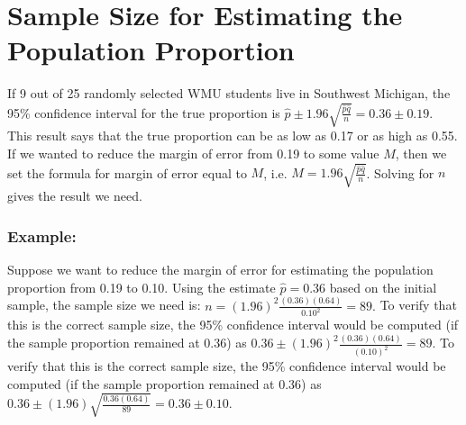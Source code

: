 \documentclass[11pt, chapterprefix=true]{scrbook}\usepackage[]{graphicx}\usepackage[]{color}
\begin{document}
\section{Sample Size for Estimating the Population Proportion}

If 9 out of 25 randomly selected WMU students live in Southwest Michigan, the 95\% confidence interval for the true proportion is $\hat{p} \pm 1.96 \sqrt{\frac{\hat{p} \hat{q}}{n}} = 0.36 \pm 0.19$.  This result says that the true proportion can be as low as 0.17 or as high as 0.55.  If we wanted to reduce the margin of error from 0.19 to some value $M$, then we set the formula for margin of error equal to $M$, i.e. $M = 1.96 \sqrt{\frac{\hat{p} \hat{q}}{n}}$.  Solving for $n$ gives the result we need.


\subsubsection{Example:} Suppose we want to reduce the margin of error for estimating the population proportion from 0.19 to 0.10.  Using the estimate $\hat{p} = 0.36$  based on the initial sample, the sample size we need is: $
n = (1.96)^2 \frac{(0.36)(0.64)}{0.10^2} = 89.$  To verify that this is the correct sample size, the 95\% confidence interval would be computed (if the sample proportion remained at 0.36) as $ 0.36 \pm (1.96)^2 \frac{(0.36)(0.64)}{(0.10)^2} = 89$.  To verify that this is the correct sample size, the 95\% confidence interval would be computed (if the sample proportion remained at 0.36) as $0.36 \pm (1.96) \sqrt{ \frac{0.36(0.64)}{89}} = 0.36 \pm 0.10$.

\twocolumn
\end{document}
